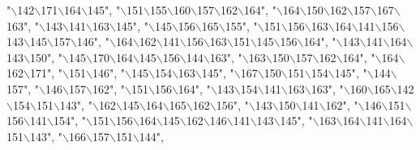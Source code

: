 \begin{DoxyCode}
\textcolor{stringliteral}{"\(\backslash\)142\(\backslash\)171\(\backslash\)164\(\backslash\)145"}, \textcolor{stringliteral}{"\(\backslash\)151\(\backslash\)155\(\backslash\)160\(\backslash\)157\(\backslash\)162\(\backslash\)164"}, \textcolor{stringliteral}{"\(\backslash\)164\(\backslash\)150\(\backslash\)162\(\backslash\)157\(\backslash\)167\(\backslash\)163"}, \textcolor{stringliteral}{"\(\backslash\)143\(\backslash\)141\(\backslash\)163\(\backslash\)145"}, 
\textcolor{stringliteral}{"\(\backslash\)145\(\backslash\)156\(\backslash\)165\(\backslash\)155"}, \textcolor{stringliteral}{"\(\backslash\)151\(\backslash\)156\(\backslash\)163\(\backslash\)164\(\backslash\)141\(\backslash\)156\(\backslash\)143\(\backslash\)145\(\backslash\)157\(\backslash\)146"}, 
\textcolor{stringliteral}{"\(\backslash\)164\(\backslash\)162\(\backslash\)141\(\backslash\)156\(\backslash\)163\(\backslash\)151\(\backslash\)145\(\backslash\)156\(\backslash\)164"}, \textcolor{stringliteral}{"\(\backslash\)143\(\backslash\)141\(\backslash\)164\(\backslash\)143\(\backslash\)150"}, \textcolor{stringliteral}{"\(\backslash\)145\(\backslash\)170\(\backslash\)164\(\backslash\)145\(\backslash\)156\(\backslash\)144\(\backslash\)163"}, 
\textcolor{stringliteral}{"\(\backslash\)163\(\backslash\)150\(\backslash\)157\(\backslash\)162\(\backslash\)164"}, \textcolor{stringliteral}{"\(\backslash\)164\(\backslash\)162\(\backslash\)171"}, \textcolor{stringliteral}{"\(\backslash\)151\(\backslash\)146"}, \textcolor{stringliteral}{"\(\backslash\)145\(\backslash\)154\(\backslash\)163\(\backslash\)145"}, \textcolor{stringliteral}{"\(\backslash\)167\(\backslash\)150\(\backslash\)151\(\backslash\)154\(\backslash\)145"}, 
\textcolor{stringliteral}{"\(\backslash\)144\(\backslash\)157"}, \textcolor{stringliteral}{"\(\backslash\)146\(\backslash\)157\(\backslash\)162"}, \textcolor{stringliteral}{"\(\backslash\)151\(\backslash\)156\(\backslash\)164"}, \textcolor{stringliteral}{"\(\backslash\)143\(\backslash\)154\(\backslash\)141\(\backslash\)163\(\backslash\)163"}, 
\textcolor{stringliteral}{"\(\backslash\)160\(\backslash\)165\(\backslash\)142\(\backslash\)154\(\backslash\)151\(\backslash\)143"}, \textcolor{stringliteral}{"\(\backslash\)162\(\backslash\)145\(\backslash\)164\(\backslash\)165\(\backslash\)162\(\backslash\)156"}, \textcolor{stringliteral}{"\(\backslash\)143\(\backslash\)150\(\backslash\)141\(\backslash\)162"}, \textcolor{stringliteral}{"\(\backslash\)146\(\backslash\)151\(\backslash\)156\(\backslash\)141\(\backslash\)154"}, 
\textcolor{stringliteral}{"\(\backslash\)151\(\backslash\)156\(\backslash\)164\(\backslash\)145\(\backslash\)162\(\backslash\)146\(\backslash\)141\(\backslash\)143\(\backslash\)145"}, \textcolor{stringliteral}{"\(\backslash\)163\(\backslash\)164\(\backslash\)141\(\backslash\)164\(\backslash\)151\(\backslash\)143"}, \textcolor{stringliteral}{"\(\backslash\)166\(\backslash\)157\(\backslash\)151\(\backslash\)144"}, 

\end{DoxyCode}
